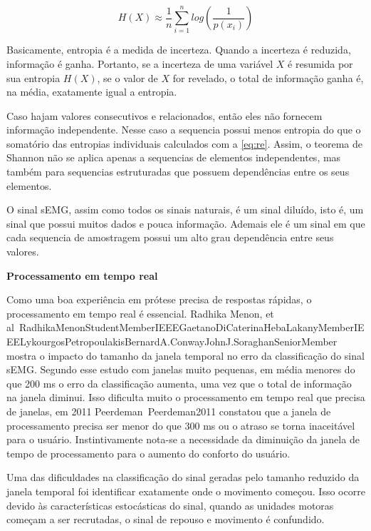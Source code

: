 \documentclass[a4paper, 12pt]{ppgeb}
\begin{document}
\begin{equation} \label{eq:re}
H(X) \approx \frac{1}{n} \sum_{i=1}^{n} log(\frac{1}{p(x_i)})
\end{equation}

Basicamente, entropia é a medida de incerteza. Quando a incerteza é reduzida, informação é ganha. Portanto, se a incerteza de uma variável \(X\) é resumida por sua entropia \(H(X)\), se o valor de \(X\) for revelado, o total de informação ganha é, na média, exatamente igual a entropia.

Caso hajam valores consecutivos e relacionados, então eles não fornecem informação independente. Nesse caso a sequencia possui menos entropia do que o somatório das entropias individuais calculados com a \autoref{eq:re}. Assim, o teorema de Shannon não se aplica apenas a sequencias de elementos independentes, mas também para sequencias estruturadas que possuem dependências entre os seus elementos.


O sinal sEMG, assim como todos os sinais naturais, é um sinal diluído, isto é, um sinal que possui muitos dados e pouca informação. Ademais ele é um sinal em que cada sequencia de amostragem possui um alto grau dependência entre seus valores.

\textbf{Processamento em tempo real}

Como uma boa experiência em prótese precisa de respostas rápidas, o processamento em tempo real é essencial. Radhika Menon, et al~\cite{resumoestendido}{RadhikaMenonStudentMemberIEEEGaetanoDiCaterinaHebaLakanyMemberIEEELykourgosPetropoulakisBernardA.ConwayJohnJ.SoraghanSeniorMember} mostra o impacto do tamanho da janela temporal no erro da classificação do sinal sEMG. Segundo esse estudo com janelas muito pequenas, em média menores do que 200 ms o erro da classificação aumenta, uma vez que o total de informação na janela diminui. Isso dificulta muito o processamento em tempo real que precisa de janelas, em 2011 Peerdeman~\cite{resumoestendido}{Peerdeman2011} constatou que a janela de processamento precisa ser menor do que 300 ms ou o atraso se torna inaceitável para o usuário. Instintivamente nota-se a necessidade da diminuição da janela de tempo de processamento para o aumento do conforto do usuário.

Uma das dificuldades na classificação do sinal geradas pelo tamanho reduzido da janela temporal foi identificar exatamente onde o movimento começou. Isso ocorre devido às características estocásticas do sinal, quando as unidades motoras começam a ser recrutadas, o sinal de repouso e movimento é confundido.
\end{document}
